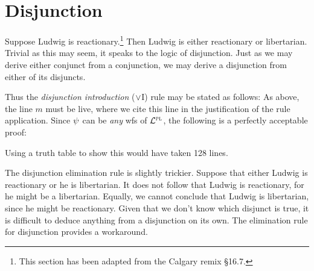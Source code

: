 \section{Disjunction}

Suppose Ludwig is reactionary.\footnote{This section has been adapted from the Calgary remix \S16.7.}
Then Ludwig is either reactionary or libertarian.
Trivial as this may seem, it speaks to the logic of disjunction.
Just as we may derive either conjunct from a conjunction, we may derive a disjunction from either of its disjuncts.

Thus the \textit{disjunction introduction} ($\vee$I) rule may be stated as follows:
As above, the line $m$ must be live, where we cite this line in the justification of the rule application. 
Since $\psi$ can be \emph{any} wfs of $\mathcal{L}^{\textsc{pl}}$, the following is a perfectly acceptable proof:
\begin{fitchproof}
	 \pr{}
\end{fitchproof}
Using a truth table to show this would have taken 128 lines.

The disjunction elimination rule is slightly trickier.
Suppose that either Ludwig is reactionary or he is libertarian.
It does not follow that Ludwig is reactionary, for he might be a libertarian.
Equally, we cannot conclude that Ludwig is libertarian, since he might be reactionary.
Given that we don't know which disjunct is true, it is difficult to deduce anything from a disjunction on its own.
The elimination rule for disjunction provides a workaround.

